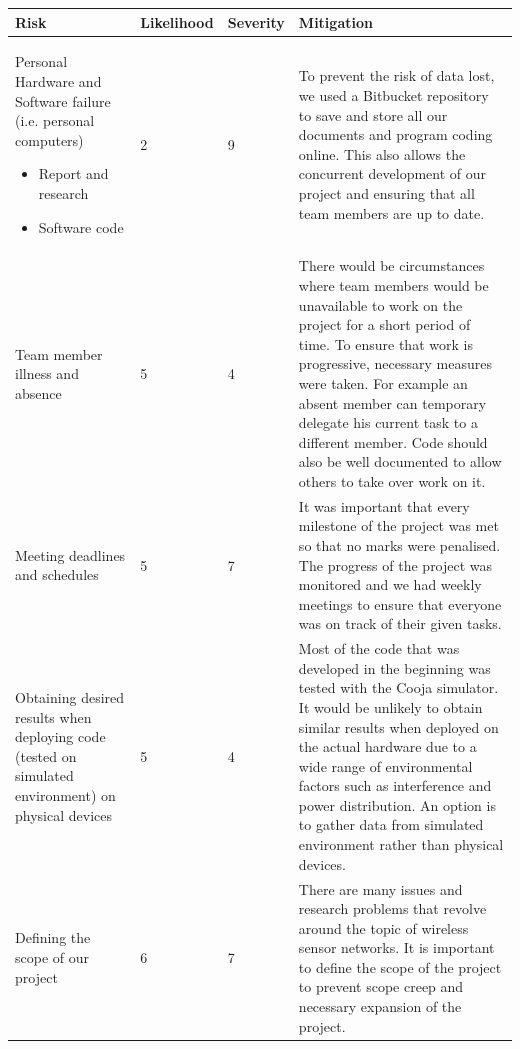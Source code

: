 \begin{table}[H]
\centering
\begin{tabular}{| p{4cm} | l | l | p{7cm} |}
	\hline
	Risk & Likelihood & Severity & Mitigation\\
	\hline	
	
	Personal Hardware and Software failure (i.e. personal computers)
	\begin{itemize}
		\item Report and research
		\item Software code
	\end{itemize}
	 & 2 & 9 & To prevent the risk of data lost, we used a Bitbucket repository to save and store all our documents and program coding online. This also allows the concurrent development of our project and ensuring that all team members are up to date.
	 
	\\ \hline
	
	Team member illness and absence
	& 5 & 4 & There would be circumstances where team members would be unavailable to work on the project for a short period of time. To ensure that work is progressive, necessary measures were taken. For example an absent member can temporary delegate his current task to a different member. Code should also be well documented to allow others to take over work on it.
	
	\\ \hline
		
	Meeting deadlines and schedules
	& 5 & 7 & It was important that every milestone of the project was met so that no marks were penalised. The progress of the project was monitored and we had weekly meetings to ensure that everyone was on track of their given tasks.
	
	\\ \hline
	
	Obtaining desired results when deploying code (tested on simulated environment) on physical devices
	& 5 & 4 & Most of the code that was developed in the beginning was tested with the Cooja simulator. It would be unlikely to obtain similar results when deployed on the actual hardware due to a wide range of environmental factors such as interference and power distribution. An option is to gather data from simulated environment rather than physical devices.
	
	\\ \hline
		
	Defining the scope of our project
	& 6 & 7 & There are many issues and research problems that revolve around the topic of wireless sensor networks. It is important to define the scope of the project to prevent scope creep and necessary expansion of the project.


\end{tabular}
\end{table}
